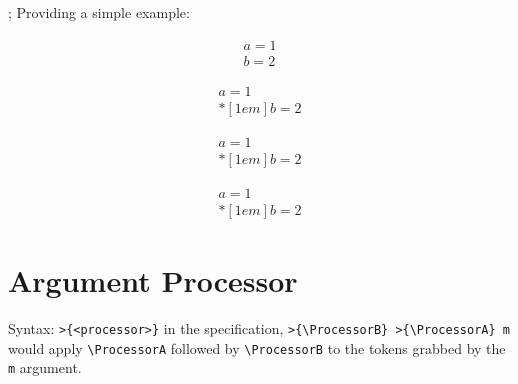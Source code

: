 \documentclass[oneside]{book}
\begin{document}
\TypeT{!}; Providing a simple example:
\begin{code}

\begin{align}
  a = 1 \\[1em]
  b = 2
\end{align}

\begin{align}
  a = 1 \\*[1em]
  b = 2
\end{align}

\begin{align}
  a = 1 \\* [1em]
  b = 2
\end{align}

\begin{align}
  a = 1 \\ *[1em]
  b = 2
\end{align}
\end{code}



\section{Argument Processor}
Syntax: \verb|>{<processor>}| in the specification, \verb|>{\ProcessorB} >{\ProcessorA} m| would apply 
\verb|\ProcessorA| followed by \verb|\ProcessorB| to the tokens grabbed by the \texttt{m} argument.
\end{document}
